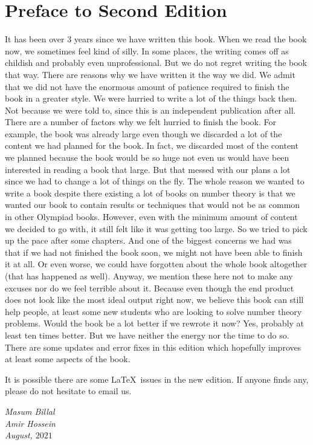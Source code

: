\documentclass[leqno,12pt]{book}
\begin{document}
\section*{Preface to Second Edition}
It has been over $3$ years since we have written this book. When we read the book now, we sometimes feel kind of silly. In some places, the writing comes off as childish and probably even unprofessional. But we do not regret writing the book that way. There are reasons why we have written it the way we did. We admit that we did not have the enormous amount of patience required to finish the book in a greater style. We were hurried to write a lot of the things back then. Not because we were told to, since this is an independent publication after all. There are a number of factors why we felt hurried to finish the book. For example, the book was already large even though we discarded a lot of the content we had planned for the book. In fact, we discarded most of the content we planned because the book would be so huge not even us would have been interested in reading a book that large. But that messed with our plans a lot since we had to change a lot of things on the fly. The whole reason we wanted to write a book despite there existing a lot of books on number theory is that we wanted our book to contain results or techniques that would not be as common in other Olympiad books. However, even with the minimum amount of content we decided to go with, it still felt like it was getting too large. So we tried to pick up the pace after some chapters. And one of the biggest concerns we had was that if we had not finished the book soon, we might not have been able to finish it at all. Or even worse, we could have forgotten about the whole book altogether (that has happened as well). Anyway, we mention these here not to make any excuses nor do we feel terrible about it. Because even though the end product does not look like the most ideal output right now, we believe this book can still help people, at least some new students who are looking to solve number theory problems. Would the book be a lot better if we rewrote it now? Yes, probably at least ten times better. But we have neither the energy nor the time to do so. There are some updates and error fixes in this edition which hopefully improves at least some aspects of the book.

It is possible there are some \LaTeX\ issues in the new edition. If anyone finds any, please do not hesitate to email us.

\begin{flushright}
	\it Masum Billal\\
	Amir Hossein\\
	August, $2021$
\end{flushright}
\end{document}
